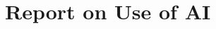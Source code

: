 \documentclass[12pt,letterpaper]{article}
\begin{document}


\label{MathmodelSolutionEnd}

\clearpage
\section*{Report on Use of AI}
\end{document}
